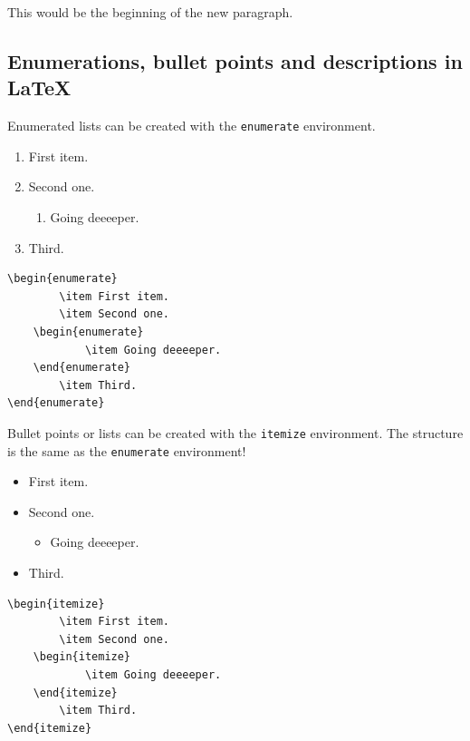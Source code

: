 This would be the beginning of the new paragraph.

\subsection{Enumerations, bullet points and descriptions in \LaTeX}

Enumerated lists can be created with the \verb|enumerate| environment.

\begin{enumerate}
		\item First item.
		\item Second one.
	\begin{enumerate}
			\item Going deeeeper.
	\end{enumerate}
		\item Third.
\end{enumerate}

\begin{lstlisting}[language={[LaTeX]TeX}]
\begin{enumerate}
		\item First item.
		\item Second one.
	\begin{enumerate}
			\item Going deeeeper.
	\end{enumerate}
		\item Third.
\end{enumerate}
\end{lstlisting}

Bullet points or lists can be created with the \verb|itemize| environment. The structure is the same as the \verb|enumerate| environment!

\begin{itemize}
		\item First item.
		\item Second one.
	\begin{itemize}
			\item Going deeeeper.
	\end{itemize}
		\item Third.
\end{itemize}

\begin{lstlisting}[language={[LaTeX]TeX}]
\begin{itemize}
		\item First item.
		\item Second one.
	\begin{itemize}
			\item Going deeeeper.
	\end{itemize}
		\item Third.
\end{itemize}
\end{lstlisting}

